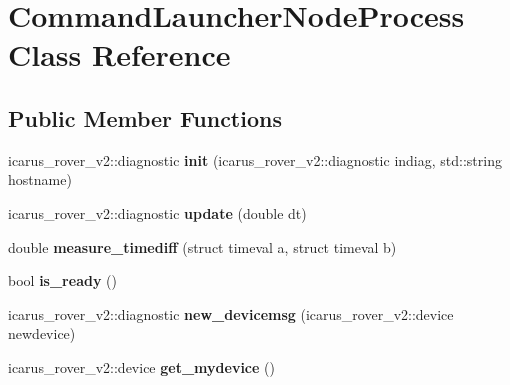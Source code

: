 \hypertarget{classCommandLauncherNodeProcess}{}\section{Command\+Launcher\+Node\+Process Class Reference}
\label{classCommandLauncherNodeProcess}
\subsection*{Public Member Functions}
\begin{DoxyCompactItemize}
\item 
\mbox{\label{classCommandLauncherNodeProcess_ae1096fbbb86e25c420cf74aa72fd7d74}} 
icarus\+\_\+rover\+\_\+v2\+::diagnostic {\bfseries init} (icarus\+\_\+rover\+\_\+v2\+::diagnostic indiag, std\+::string hostname)
\item 
\mbox{\label{classCommandLauncherNodeProcess_a09739d62ce954409c3c36c7ac71041d1}} 
icarus\+\_\+rover\+\_\+v2\+::diagnostic {\bfseries update} (double dt)
\item 
\mbox{\label{classCommandLauncherNodeProcess_ae948236837989293a3dfe8059dcd3c04}} 
double {\bfseries measure\+\_\+timediff} (struct timeval a, struct timeval b)
\item 
\mbox{\label{classCommandLauncherNodeProcess_a109a5324ebfaf6c2479d4283a9002262}} 
bool {\bfseries is\+\_\+ready} ()
\item 
\mbox{\label{classCommandLauncherNodeProcess_a7f397dcaef6d1bf7eb02f33e52581a14}} 
icarus\+\_\+rover\+\_\+v2\+::diagnostic {\bfseries new\+\_\+devicemsg} (icarus\+\_\+rover\+\_\+v2\+::device newdevice)
\item 
\mbox{\label{classCommandLauncherNodeProcess_a26d10422b2e9da592908a3025d35ed1f}} 
icarus\+\_\+rover\+\_\+v2\+::device {\bfseries get\+\_\+mydevice} ()
\item 
\mbox{\label{classCommandLauncherNodeProcess_ad53df5060aaf30ae4b8041b4212d065f}} 

\end{DoxyCompactItemize}
